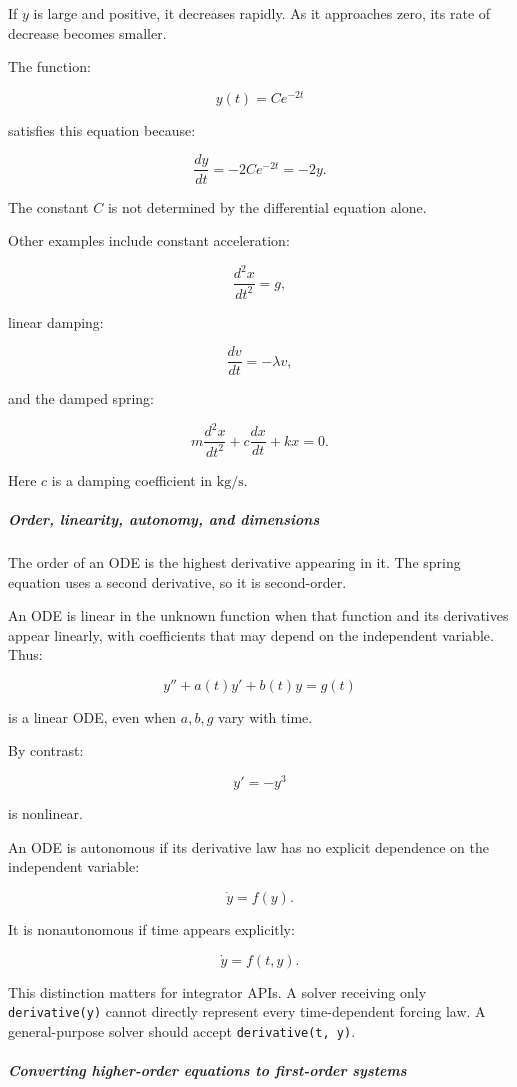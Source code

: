 If \(y\) is large and positive, it decreases rapidly. As it approaches zero, its rate of decrease becomes smaller.

The function:

\[
y(t)=Ce^{-2t}
\]

satisfies this equation because:

\[
\frac{dy}{dt}=-2Ce^{-2t}=-2y.
\]

The constant \(C\) is not determined by the differential equation alone.

Other examples include constant acceleration:

\[
\frac{d^2x}{dt^2}=g,
\]

linear damping:

\[
\frac{dv}{dt}=-\lambda v,
\]

and the damped spring:

\[
m\frac{d^2x}{dt^2}+c\frac{dx}{dt}+kx=0.
\]

Here \(c\) is a damping coefficient in \(\mathrm{kg/s}\).

\subparagraph{Order, linearity, autonomy, and dimensions}\label{order-linearity-autonomy-and-dimensions}

The order of an ODE is the highest derivative appearing in it. The spring equation uses a second derivative, so it is second-order.

An ODE is linear in the unknown function when that function and its derivatives appear linearly, with coefficients that may depend on the independent variable. Thus:

\[
y''+a(t)y'+b(t)y=g(t)
\]

is a linear ODE, even when \(a,b,g\) vary with time.

By contrast:

\[
y'=-y^3
\]

is nonlinear.

An ODE is autonomous if its derivative law has no explicit dependence on the independent variable:

\[
\dot y=f(y).
\]

It is nonautonomous if time appears explicitly:

\[
\dot y=f(t,y).
\]

This distinction matters for integrator APIs. A solver receiving only \texttt{derivative(y)} cannot directly represent every time-dependent forcing law. A general-purpose solver should accept \texttt{derivative(t,\ y)}.

\subparagraph{Converting higher-order equations to first-order systems}\label{converting-higher-order-equations-to-first-order-systems}

